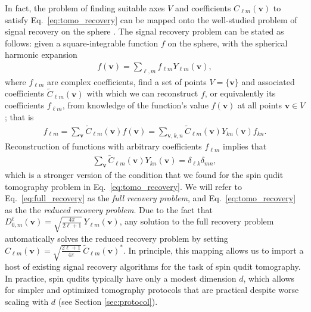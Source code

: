 \documentclass[a4paper,twocolumn,unpublished]{quantumarticle}
\newcommand{\p}[1]{\left(#1\right)} %
\renewcommand{\set}[1]{\{#1\}} %
\begin{document}
In fact, the problem of finding suitable axes $V$ and coefficients $C_{\ell m}\p{\bm v}$ to satisfy Eq.~\eqref{eq:tomo_recovery} can be mapped onto the well-studied problem of signal recovery on the sphere \cite{mcewen2011novel, rauhut2011sparse, alem2012sparse, khalid2014optimaldimensionality}.
The signal recovery problem can be stated as follows: given a square-integrable function $f$ on the sphere, with the spherical harmonic expansion
\begin{align}
  f\p{\bm v} = \sum_{\ell,m} f_{\ell m} Y_{\ell m}\p{\bm v},
\end{align}
where $f_{\ell m}$ are complex coefficients, find a set of points $V=\set{\bm v}$ and associated coefficients $\tilde C_{\ell m}\p{\bm v}$ with which we can reconstruct $f$, or equivalently its coefficients $f_{\ell m}$, from knowledge of the function's value $f\p{\bm v}$ at all points $\bm v\in V$; that is
\begin{align}
  f_{\ell m} = \sum_{\bm v} \tilde C_{\ell m}\p{\bm v} f\p{\bm v}
  = \sum_{\bm v,k,n} \tilde C_{\ell m}\p{\bm v} Y_{kn}\p{\bm v} f_{kn}.
\end{align}
Reconstruction of functions with arbitrary coefficients $f_{\ell m}$ implies that
\begin{align}
  \sum_{\bm v} \tilde C_{\ell m}\p{\bm v} Y_{kn}\p{\bm v}
  = \delta_{\ell k} \delta_{mn},
  \label{eq:full_recovery}
\end{align}
which is a stronger version of the condition that we found for the spin qudit tomography problem in Eq.~\eqref{eq:tomo_recovery}.
We will refer to Eq.~\eqref{eq:full_recovery} as the {\it full recovery problem}, and Eq.~\eqref{eq:tomo_recovery} as the the {\it reduced recovery problem}.
Due to the fact that $D^\ell_{0,m}\p{\bm v} = \sqrt{\frac{4\pi}{2\ell+1}}\, Y_{\ell m}\p{\bm v}$, any solution to the full recovery problem automatically solves the reduced recovery problem by setting $C_{\ell m}\p{\bm v} = \sqrt{\frac{2\ell+1}{4\pi}}\, \tilde C_{\ell m}\p{\bm v}^*$.
In principle, this mapping allows us to import a host of existing signal recovery algorithms \cite{mcewen2011novel, rauhut2011sparse, alem2012sparse, khalid2014optimaldimensionality} for the task of spin qudit tomography.
In practice, spin qudits typically have only a modest dimension $d$, which allows for simpler and optimized tomography protocols that are practical despite worse scaling with $d$ (see Section \ref{sec:protocol}).
\end{document}
